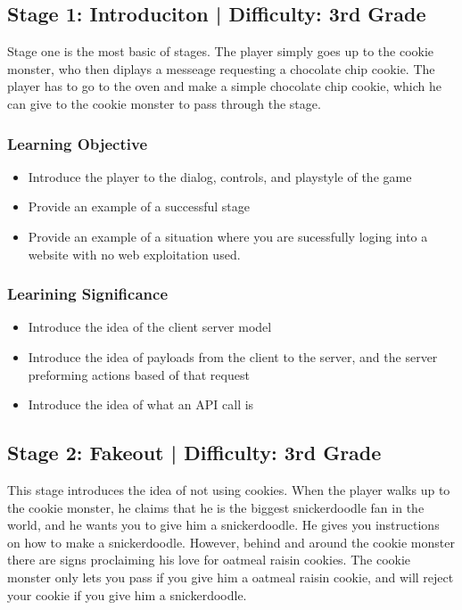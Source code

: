 \documentclass{article}
\begin{document}
\subsection{Stage 1: Introduciton | Difficulty: 3rd Grade}

Stage one is the most basic of stages. The player simply goes up to
the cookie monster, who then diplays a messeage requesting a chocolate
chip cookie. The player has to go to the oven and make a simple
chocolate chip cookie, which he can give to the cookie monster to pass
through the stage.

\subsubsection{Learning Objective}

\begin{itemize}

  \item Introduce the player to the dialog, controls, and playstyle of
the game
  \item Provide an example of a successful stage
  \item Provide an example of a situation where you are sucessfully
loging into a website with no web exploitation used.
\end{itemize}

\subsubsection{Learining Significance}

\begin{itemize}
  \item Introduce the idea of the client server model
  \item Introduce the idea of payloads from the client to the server,
    and the server preforming actions based of that request
  \item Introduce the idea of what an API call is
\end{itemize}

\subsection{Stage 2: Fakeout | Difficulty: 3rd Grade}

This stage introduces the idea of not using cookies. When the player
walks up to the cookie monster, he claims that he is the biggest
snickerdoodle fan in the world, and he wants you to give him a
snickerdoodle. He gives you instructions on how to make a
snickerdoodle. However, behind and around the cookie monster there are
signs proclaiming his love for oatmeal raisin cookies. The cookie
monster only lets you pass if you give him a oatmeal raisin cookie,
and will reject your cookie if you give him a snickerdoodle.
\end{document}
